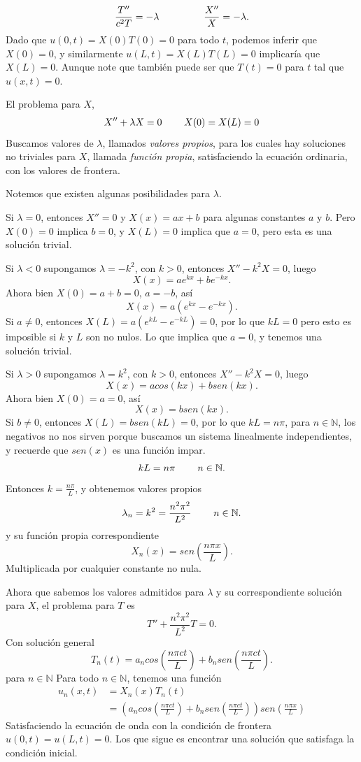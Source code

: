 \documentclass[11pt]{book}
\theoremstyle{plain}
\theoremstyle{definition}
\newcommand{\N}{\mathbb{N}}
\begin{document}
\[
\frac{T''}{c^{2}T} = -\lambda \hspace{16mm} \frac{X''}{X} = - \lambda
.\]
Dado que $u(0,t) = X(0)T(0) = 0$ para todo $t$, podemos inferir que $X(0) = 0$, y similarmente $u(L,t) = X(L)T(L) = 0$ implicaría que $X(L) = 0$. Aunque note que también puede ser que $T(t) = 0$ para $t$ tal que $u(x,t) = 0$. 

El problema para $X$, 
\begin{align}
    X'' + \lambda X = 0 \hspace{8mm} X(0) = X(L) = 0
\end{align}
Buscamos valores de $\lambda$, llamados \emph{valores propios}, para los cuales hay soluciones no triviales para $X$, llamada \emph{función propia}, satisfaciendo la ecuación ordinaria, con los valores de frontera.

Notemos que existen algunas posibilidades para $\lambda$.

Si $\lambda = 0$, entonces $X'' = 0$ y $X(x) = ax+b$ para algunas constantes $a$ y $b$. Pero $X(0) = 0$ implica $b=0$, y $X(L) = 0$ implica que $a = 0$, pero esta es una solución trivial.

Si $\lambda < 0$ supongamos $\lambda = -k^{2}$, con $k > 0$, entonces $X'' -k^{2} X = 0$, luego
\[X(x) = a e^{kx} + be^{-kx}.\]
Ahora bien $X(0) = a+b = 0$, $a = -b$, así
\[X(x) = a \left(e^{kx} - e^{-kx}\right).\]
Si $a \neq 0$, entonces $X(L) = a \left(e^{kL} - e^{-kL}\right) = 0$, por lo que $kL = 0$ pero esto es imposible si $k$ y $L$ son no nulos. Lo que implica que $a = 0$, y tenemos una solución trivial.

Si $\lambda > 0$ supongamos $\lambda = k^{2}$, con $k > 0$, entonces $X'' -k^{2} X = 0$, luego
\[X(x) = acos(kx) + bsen(kx).\]
Ahora bien $X(0) = a = 0$,  así
\[X(x) = bsen(kx).\]
Si $b \neq 0$, entonces $X(L) = bsen(kL) = 0$, por lo que $kL = n\pi$, para $n\in\N$, los negativos no nos sirven porque buscamos un sistema linealmente independientes, y recuerde que $sen(x)$ es una función impar. 
\[kL = n\pi \hspace{8mm} n\in\N.\]
Entonces $k = \frac{n\pi}{L}$, y obtenemos valores propios
\[\lambda_{n} = k^{2} = \frac{n^{2}\pi^{2}}{L^{2}} \hspace{8mm} n\in\N.\]
y su función propia correspondiente
\[X_{n}(x) = sen(\frac{n\pi x}{L}).\]
Multiplicada por cualquier constante no nula.

Ahora que sabemos los valores admitidos para $\lambda$ y su correspondiente solución para $X$, el problema para $T$ es
\[
T'' + \frac{n^{2}\pi^{2}}{L^{2}} T = 0
.\]
Con solución general 
\[T_n(t) = a_{n}cos\left(\frac{n\pi ct}{L}\right) + b_{n}sen\left(\frac{n\pi ct}{L}\right).\]
para $n\in\N$
Para todo $n\in\N$, tenemos una función
\begin{align}
    u_{n}(x,t) &= X_{n}(x)T_n(t)\\
    &=\left(a_{n}cos\left(\frac{n\pi ct}{L}\right) + b_{n}sen\left(\frac{n\pi ct}{L}\right)\right)sen(\frac{n\pi x}{L})
\end{align}
Satisfaciendo la ecuación de onda con la condición de frontera $u(0,t) = u(L,t) = 0$. Los que sigue es encontrar una solución que satisfaga la condición inicial.
\end{document}
